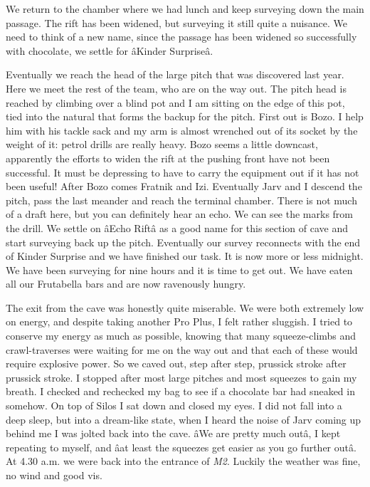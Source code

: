 We return to the chamber where we had lunch and keep surveying down the
main passage. The rift has been widened, but surveying it still quite a
nuisance. We need to think of a new name, since the passage has been
widened so successfully with chocolate, we settle for âKinder
Surpriseâ.

Eventually we reach the head of the large pitch that was discovered last
year. Here we meet the rest of the team, who are on the way out. The
pitch head is reached by climbing over a blind pot and I am sitting on
the edge of this pot, tied into the natural that forms the backup for
the pitch. First out is Bozo. I help him with his tackle sack and my arm
is almost wrenched out of its socket by the weight of it: petrol drills
are really heavy. Bozo seems a little downcast, apparently the efforts
to widen the rift at the pushing front have not been successful. It must
be depressing to have to carry the equipment out if it has not been
useful! After Bozo comes Fratnik and Izi. Eventually Jarv and I descend
the pitch, pass the last meander and reach the terminal chamber. There
is not much of a draft here, but you can definitely hear an echo. We can
see the marks from the drill. We settle on âEcho Riftâ as a good
name for this section of cave and start surveying back up the pitch.
Eventually our survey reconnects with the end of Kinder Surprise and we
have finished our task. It is now more or less midnight. We have been
surveying for nine hours and it is time to get out. We have eaten all
our Frutabella bars and are now ravenously hungry.

The exit from the cave was honestly quite miserable. We were both
extremely low on energy, and despite taking another Pro Plus, I felt
rather sluggish. I tried to conserve my energy as much as possible,
knowing that many squeeze-climbs and crawl-traverses were waiting for me
on the way out and that each of these would require explosive power. So
we caved out, step after step, prussick stroke after prussick stroke. I
stopped after most large pitches and most squeezes to gain my breath. I
checked and rechecked my bag to see if a chocolate bar had sneaked in
somehow. On top of Silos I sat down and closed my eyes. I did not fall
into a deep sleep, but into a dream-like state, when I heard the noise
of Jarv coming up behind me I was jolted back into the cave. âWe are
pretty much outâ, I kept repeating to myself, and âat least the
squeezes get easier as you go further outâ. At 4.30 a.m. we were back
into the entrance of \emph{M2}. Luckily the weather was fine, no wind
and good vis.


